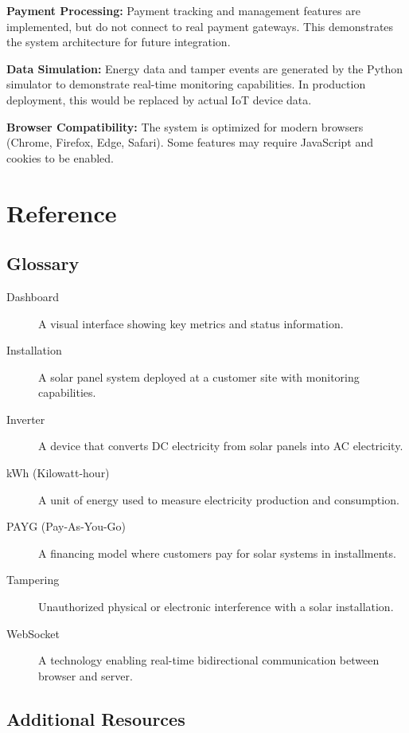 \textbf{Payment Processing:} Payment tracking and management features are implemented, but do not connect to real payment gateways. This demonstrates the system architecture for future integration.

\textbf{Data Simulation:} Energy data and tamper events are generated by the Python simulator to demonstrate real-time monitoring capabilities. In production deployment, this would be replaced by actual IoT device data.

\textbf{Browser Compatibility:} The system is optimized for modern browsers (Chrome, Firefox, Edge, Safari). Some features may require JavaScript and cookies to be enabled.

\section{Reference}
\label{sec:reference}

\subsection{Glossary}
\label{subsec:glossary}

\begin{description}
    \item[Dashboard] A visual interface showing key metrics and status information.
    \item[Installation] A solar panel system deployed at a customer site with monitoring capabilities.
    \item[Inverter] A device that converts DC electricity from solar panels into AC electricity.
    \item[kWh (Kilowatt-hour)] A unit of energy used to measure electricity production and consumption.
    \item[PAYG (Pay-As-You-Go)] A financing model where customers pay for solar systems in installments.
    \item[Tampering] Unauthorized physical or electronic interference with a solar installation.
    \item[WebSocket] A technology enabling real-time bidirectional communication between browser and server.
\end{description}

\subsection{Additional Resources}
\label{subsec:additional-resources}

